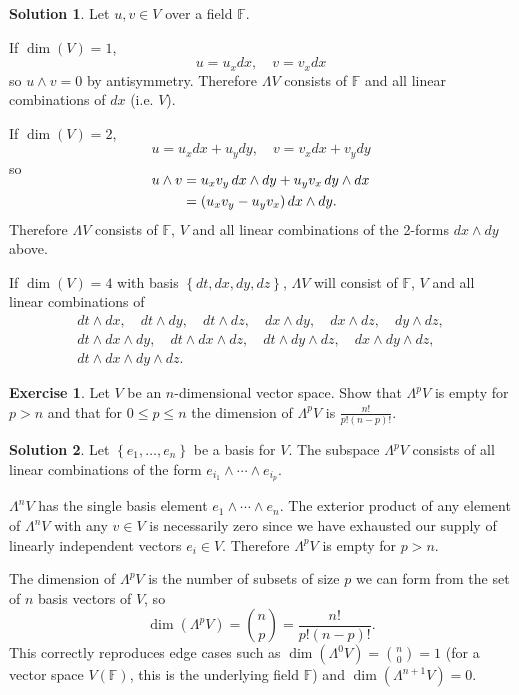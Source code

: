 \documentclass[11pt, a4paper]{report}
\theoremstyle{definition}
\newtheorem{exercise}{Exercise}[part]
\newtheorem{solution}{Solution}[part]
\newenvironment{ex}{\begin{exercise}}{\end{exercise}\pagebreak[1]}
\newenvironment{sol}{\begin{solution}}{\end{solution}\pagebreak[3]}
\renewcommand{\leq}{\leqslant}
\renewcommand*{\d}{\ensuremath\mathop{}\mathopen{}d}
\begin{document}
\begin{sol}

Let $u, v \in V$ over a field $\mathbb{F}$.

If $\dim(V) = 1$,
\[
    u = u_x dx, \quad v = v_x dx
\]
so $u \wedge v = 0$ by antisymmetry. Therefore $\Lambda V$ consists of $\mathbb{F}$ and all linear combinations of $dx$ (i.e. $V$).

If $\dim(V) = 2$,
\[
    u = u_x dx + u_y dy, \quad v = v_x dx + v_y dy
\]
so
\begin{align*}
    \SwapAboveDisplaySkip
    u \wedge v &= u_x v_y \d x \wedge dy + u_y v_x \d y \wedge dx \\
               &= (u_x v_y - u_y v_x) \d x \wedge dy.
\end{align*}
Therefore $\Lambda V$ consists of $\mathbb{F}$, $V$ and all linear combinations of the 2-forms $dx \wedge dy$ above.

If $\dim(V) = 4$ with basis $\left\{dt, dx, dy, dz\right\}$, $\Lambda V$ will consist of $\mathbb{F}$, $V$ and all linear combinations of
\begin{gather*}
    dt \wedge dx, \quad
    dt \wedge dy, \quad
    dt \wedge dz, \quad
    dx \wedge dy, \quad
    dx \wedge dz, \quad
    dy \wedge dz, \\
    dt \wedge dx \wedge dy, \quad
    dt \wedge dx \wedge dz, \quad
    dt \wedge dy \wedge dz, \quad
    dx \wedge dy \wedge dz, \\
    dt \wedge dx \wedge dy \wedge dz.
\end{gather*}

\end{sol}

\begin{ex}

Let $V$ be an $n$-dimensional vector space. Show that $\Lambda^p V$ is empty for $p > n$ and that for $0 \leq p \leq n$ the dimension of $\Lambda^p V$ is $\frac{n!}{p! (n - p)!}$.

\end{ex}

\begin{sol}

Let $\left\{e_1, \ldots, e_n\right\}$ be a basis for $V$.
The subspace $\Lambda^p V$ consists of all linear combinations of the form $e_{i_1} \wedge \cdots \wedge e_{i_p}$.

$\Lambda^n V$ has the single basis element $e_1 \wedge \cdots \wedge e_n$.
The exterior product of any element of $\Lambda^n V$ with any $v \in V$ is necessarily zero since we have exhausted our supply of linearly independent vectors $e_i \in V$. Therefore $\Lambda^p V$ is empty for $p > n$.

The dimension of $\Lambda^p V$ is the number of subsets of size $p$ we can form from the set of $n$ basis vectors of $V$, so
\[
    \dim(\Lambda^p V) = \binom{n}{p} = \frac{n!}{p! (n - p)!}.
\]
This correctly reproduces edge cases such as $\dim(\Lambda^0 V) = \binom{n}{0} = 1$ (for a vector space $V(\mathbb{F})$, this is the underlying field $\mathbb{F}$) and $\dim(\Lambda^{n+1}V) = 0$.

\end{sol}
\end{document}
